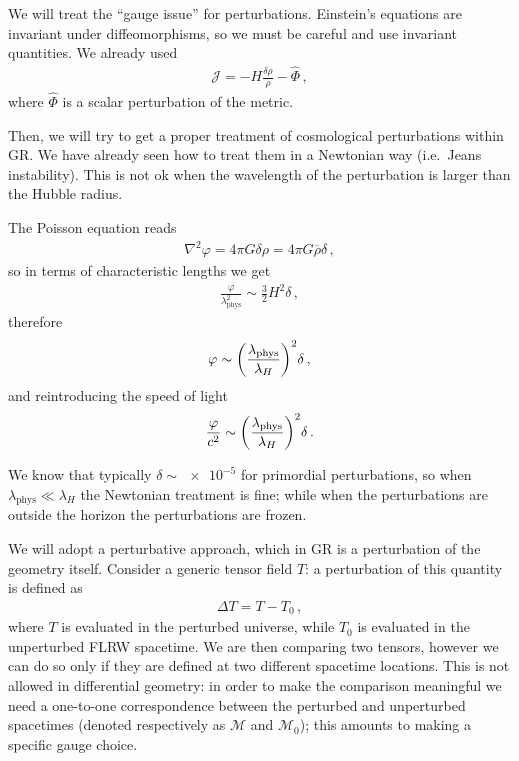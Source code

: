 \documentclass[main.tex]{subfiles}
\begin{document}
We will treat the ``gauge issue'' for perturbations. Einstein's equations are invariant under diffeomorphisms, so we must be careful and use invariant quantities. 
We already used 
%
\begin{align}
\mathcal{J} = - H \frac{ \delta \rho}{\rho } - \hat{\Phi}
\,,
\end{align}
%
where \(\hat{\Phi}\) is a scalar perturbation of the metric. 

Then, we will try to get a proper treatment of cosmological perturbations within GR.
We have already seen how to treat them in a Newtonian way (i.e.\ Jeans instability). 
This is not ok when the wavelength of the perturbation is larger than the Hubble radius.

The Poisson equation reads 
%
\begin{align}
\nabla^2 \varphi = 4 \pi G \delta \rho  = 4 \pi G \overline{\rho} \delta 
\,,
\end{align}
%
so in terms of characteristic lengths we get 
%
\begin{align}
\frac{\varphi}{\lambda^2 _{\text{phys}}} \sim \frac{3}{2} H^2 \delta 
\,,
\end{align}
%
therefore 
%
\begin{align}
\varphi \sim \qty(\frac{\lambda _{\text{phys}}}{\lambda _H})^2 \delta 
\,,
\end{align}
%
and reintroducing the speed of light 
%
\begin{align}
\frac{\varphi}{c^2} \sim \qty(\frac{\lambda _{\text{phys}}}{\lambda _H})^2 \delta 
\,.
\end{align}

We know that typically \(\delta \sim \num{e-5}\) for primordial perturbations, so when \(\lambda _{\text{phys}} \ll \lambda _H\) the Newtonian treatment is fine; while when the perturbations are outside the horizon the perturbations are frozen. 

We will adopt a perturbative approach, which in GR is a perturbation of the geometry itself. 
Consider a generic tensor field \(T\): a perturbation of this quantity is defined as 
%
\begin{align}
\Delta T = T - T_0 
\,,
\end{align}
%
where \(T\) is evaluated in the perturbed universe, while \(T_0 \) is evaluated in the unperturbed FLRW spacetime. 
We are then comparing two tensors, however we can do so only if they are defined at two different spacetime locations. 
This is not allowed in differential geometry: in order to make the comparison meaningful we need a one-to-one correspondence between the perturbed and unperturbed spacetimes (denoted respectively as \(\mathcal{M}\) and \(\mathcal{M}_0\)); this amounts to making a specific gauge choice. 
\end{document}
